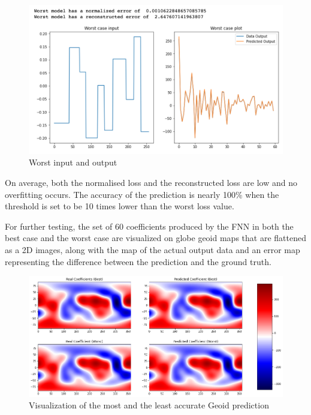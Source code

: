 \begin{figure}[H]
    \caption{Worst input and output}
    \includegraphics[scale=0.6]{figures/geoid_images/Geoid_Worst.png}
\end{figure}

On average, both the normalised loss and the reconstructed loss are low and no overfitting occurs. The accuracy of the prediction is nearly 100\% when the threshold is set to be 10 times lower than the worst loss value. 

For further testing, the set of 60 coefficients produced by the FNN in both the best case and the worst case are visualized on globe geoid maps that are flattened as a 2D images, along with the map of the actual output data and an error map representing the difference between the prediction and the ground truth.

\begin{figure}[H]
    \caption{Visualization of the most and the least accurate Geoid prediction}
    \includegraphics[scale=0.4]{figures/geoid_images/Geoid_Best_Worst.png}
\end{figure}

